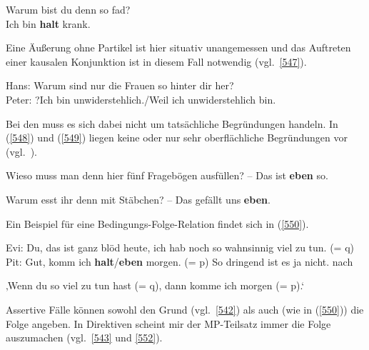 \begin{exe}
	\ex\label{546} 
	Warum bist du denn so fad?\\
	Ich bin \textbf{halt} krank.	
	\hfill\hbox{\citet[312]{Schlieben-Lange1979}} 	
\end{exe}	
Eine Äußerung ohne Partikel ist hier situativ unangemessen und das Auftreten einer kausalen Konjunktion ist in diesem Fall notwendig (vgl.\ \ref{547}).

\begin{exe}
	\ex\label{547} 
	Hans: Warum sind nur die Frauen so hinter dir her?\\
	Peter: ?Ich bin unwiderstehlich./Weil ich unwiderstehlich bin.	
	\newline
	\hbox{}\hfill\hbox{\citet[121]{Thurmair1989}} 	
\end{exe}
Bei den  muss es sich dabei nicht um tatsächliche Begründungen handeln. In (\ref{548}) und (\ref{549}) liegen keine oder nur sehr oberflächliche Begründungen vor (vgl.\ \citealt[322]{Troemel-Ploetz1979}).

\begin{exe}
	\ex\label{548} 
	Wieso muss man denn hier fünf Fragebögen ausfüllen? – Das ist \textbf{eben} so.	
	\newline
	\hbox{}\hfill\hbox{\citet[312]{Schlieben-Lange1979}} 	
\end{exe}	
\begin{exe}
	\ex\label{549} 
	Warum esst ihr denn mit Stäbchen? – Das gefällt uns \textbf{eben}.
	\newline
	\hbox{}\hfill\hbox{\citet[322]{Troemel-Ploetz1979}} 	
\end{exe}																	              
Ein Beispiel für eine Bedingungs-Folge-Relation findet sich in (\ref{550}).

\begin{exe}
	\ex\label{550}\small
	Evi: Du, das ist ganz blöd heute, ich hab noch so wahnsinnig viel zu tun. (= q)\\
	Pit: Gut, komm ich \textbf{halt}\slash\textbf{eben} morgen. (= p) So dringend ist es ja nicht.
	\newline
	\hbox{}\hfill\hbox{nach \citet[122]{Thurmair1989}} 	
\end{exe}

\begin{exe}
	\ex\label{551} 
	‚Wenn du so viel zu tun hast (= q), dann komme ich morgen (= p).‘ 	
\end{exe}
Assertive Fälle können sowohl den Grund (vgl.\ \ref{542}) als auch (wie in (\ref{550})) die Folge angeben. In Direktiven scheint mir der MP-Teilsatz immer die Folge auszumachen (vgl.\ \ref{543} und \ref{552}).

